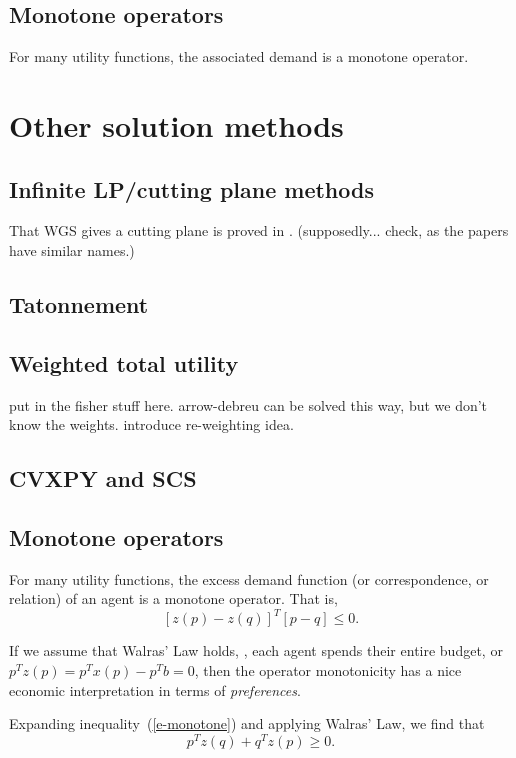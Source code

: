 \documentclass[12pt]{article}
\begin{document}
\subsection{Monotone operators}
For many utility functions, the associated demand is
a monotone operator.

\section{Other solution methods}

\subsection{Infinite LP/cutting plane methods}
That WGS gives a cutting plane is proved in \cite{arrow1959stability}.
(supposedly... check, as the papers have similar names.)

\subsection{Tatonnement}

\subsection{Weighted total utility}
put in the fisher stuff here. arrow-debreu can be solved this way, but we
don't know the weights. introduce re-weighting idea.

\subsection{CVXPY and SCS}

\subsection{Monotone operators}
For many utility functions,
the excess demand function
(or correspondence,
or relation) of an agent is a
monotone operator.
That is,
\begin{equation}
\label{e-monotone}
\left[z(p) - z(q) \right]^T \left[p - q\right] \leq 0.
\end{equation}

If we assume that Walras' Law holds, \ie, each agent spends their entire
budget, or $p^T z(p) = p^T x(p) - p^T b = 0$, then the operator monotonicity has
a nice economic interpretation in terms of \emph{preferences}.

Expanding inequality~(\ref{e-monotone}) and applying Walras' Law, we find that
\[
p^T z(q) + q^T z(p) \geq 0.
\]
\end{document}
